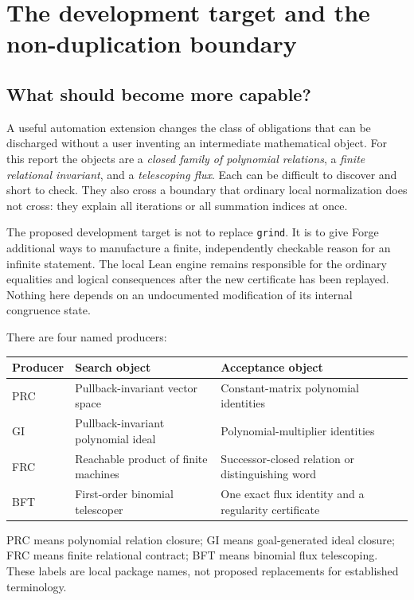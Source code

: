 \section{The development target and the non-duplication boundary}
\label{sec:scope}

\subsection{What should become more capable?}

A useful automation extension changes the class of obligations that can be discharged without a user inventing an intermediate mathematical object. For this report the objects are a \emph{closed family of polynomial relations}, a \emph{finite relational invariant}, and a \emph{telescoping flux}. Each can be difficult to discover and short to check. They also cross a boundary that ordinary local normalization does not cross: they explain all iterations or all summation indices at once.

The proposed development target is not to replace \texttt{grind}. It is to give Forge additional ways to manufacture a finite, independently checkable reason for an infinite statement. The local Lean engine remains responsible for the ordinary equalities and logical consequences after the new certificate has been replayed. Nothing here depends on an undocumented modification of its internal congruence state.

There are four named producers:
\begin{center}
\begin{tabularx}{\textwidth}{@{}lXX@{}}
\toprule
Producer & Search object & Acceptance object\\
\midrule
PRC & Pullback-invariant vector space & Constant-matrix polynomial identities\\
GI & Pullback-invariant polynomial ideal & Polynomial-multiplier identities\\
FRC & Reachable product of finite machines & Successor-closed relation or distinguishing word\\
BFT & First-order binomial telescoper & One exact flux identity and a regularity certificate\\
\bottomrule
\end{tabularx}
\end{center}
PRC means polynomial relation closure; GI means goal-generated ideal closure; FRC means finite relational contract; BFT means binomial flux telescoping. These labels are local package names, not proposed replacements for established terminology.

